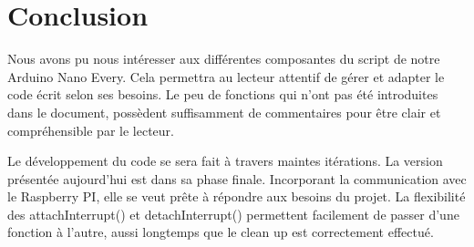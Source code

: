 \documentclass[
	a4paper,									%
	11pt,										%
	twoside,									%
	openright,									%
	notitlepage,									%
	parskip=half,								%
]{scrreprt}										%
\begin{document}
 \chapter{Conclusion}
 Nous avons pu nous intéresser aux différentes composantes du script de notre Arduino Nano Every. Cela permettra au 
 lecteur attentif de gérer et adapter le code écrit selon ses besoins. Le peu de fonctions qui n'ont pas été introduites
 dans le document, possèdent suffisamment de commentaires pour être clair et compréhensible par le lecteur. \par

 Le développement du code se sera fait à travers maintes itérations. La version présentée aujourd'hui est dans 
 sa phase finale. Incorporant la communication avec le Raspberry PI, elle se veut prête à répondre aux 
 besoins du projet. La flexibilité des attachInterrupt() et detachInterrupt() permettent facilement de passer
 d'une fonction à l'autre, aussi longtemps que le clean up est correctement effectué.
\end{document}
